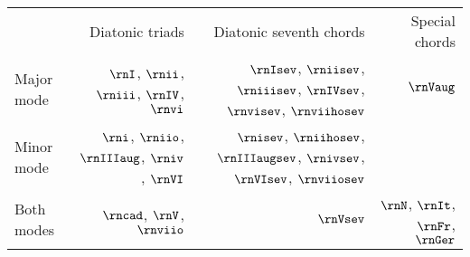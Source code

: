 \begin{tabular}{lrrr}
            & Diatonic triads                                & Diatonic seventh chords                                                       & Special chords        \\
Major mode & $\rnI$, $\rnii$, $\rniii$, $\rnIV$, $\rnvi$     & $\rnIsev$, $\rniisev$, $\rniiisev$, $\rnIVsev$, $\rnvisev$, $\rnviihosev$     & $\rnVaug$                \\
Minor mode & $\rni$, $\rniio$, $\rnIIIaug$, $\rniv$, $\rnVI$ & $\rnisev$, $\rniihosev$, $\rnIIIaugsev$, $\rnivsev$, $\rnVIsev$, $\rnviiosev$ &                       \\
Both modes & $\rncad$, $\rnV$, $\rnviio$                     & $\rnVsev$                                                                     & $\rnN$, $\rnIt$, $\rnFr$, $\rnGer$
\end{tabular}
